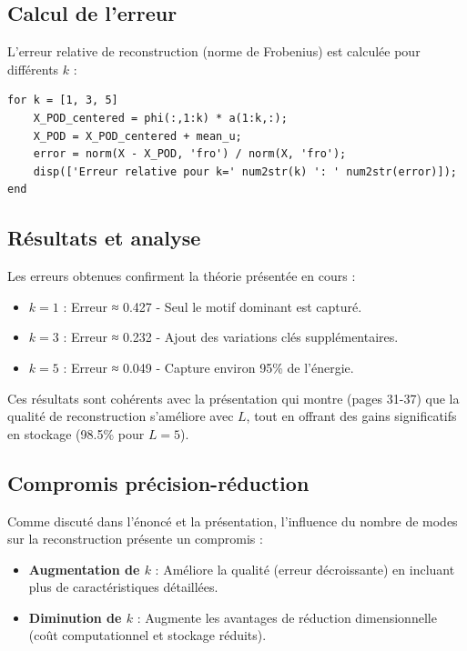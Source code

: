 \documentclass{rapportECL}
\begin{document}
\subsection{Calcul de l'erreur}
L'erreur relative de reconstruction (norme de Frobenius) est calculée pour différents \( k \) :

\begin{lstlisting}[caption={Reconstruction et calcul d'erreur}, label=code:reconstruction]
for k = [1, 3, 5]
    X_POD_centered = phi(:,1:k) * a(1:k,:);
    X_POD = X_POD_centered + mean_u;
    error = norm(X - X_POD, 'fro') / norm(X, 'fro');
    disp(['Erreur relative pour k=' num2str(k) ': ' num2str(error)]);
end
\end{lstlisting}

\subsection{Résultats et analyse}
Les erreurs obtenues confirment la théorie présentée en cours :
\begin{itemize}
    \item \( k=1 \) : Erreur ≈ 0.427 - Seul le motif dominant est capturé.
    \item \( k=3 \) : Erreur ≈ 0.232 - Ajout des variations clés supplémentaires.
    \item \( k=5 \) : Erreur ≈ 0.049 - Capture environ 95\% de l'énergie.
\end{itemize}

Ces résultats sont cohérents avec la présentation qui montre (pages 31-37) que la qualité de reconstruction s'améliore avec \( L \), tout en offrant des gains significatifs en stockage (98.5\% pour \( L=5 \)).


\subsection{Compromis précision-réduction}
Comme discuté dans l'énoncé et la présentation, l'influence du nombre de modes sur la reconstruction présente un compromis :
\begin{itemize}
    \item \textbf{Augmentation de \( k \)} : Améliore la qualité (erreur décroissante) en incluant plus de caractéristiques détaillées.
    \item \textbf{Diminution de \( k \)} : Augmente les avantages de réduction dimensionnelle (coût computationnel et stockage réduits).
\end{itemize}
\end{document}

